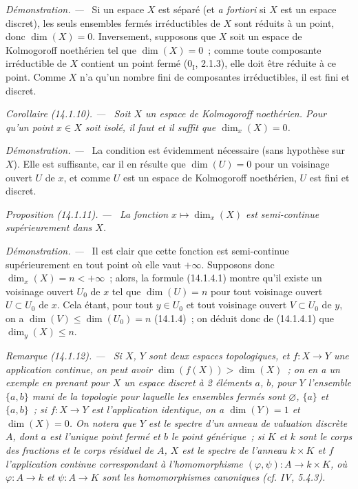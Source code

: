 \documentclass[10pt,oneside]{book}
\makeatletter
\newcommand{\setmanualcurrentlabel}[1]{\def\@currentlabel{#1}}
\newcommand{\oldpage}[2][]{%
  \setcounter{footnote}{0}%
  \marginpar{\scriptsize\textbf{#1}~|~#2}\ignorespaces}
\newenvironment{proposition}[1][]{%
  \setmanualcurrentlabel{#1}\par\medskip\noindent\itshape Proposition (#1). ---\ }{\par}
\newenvironment{corollary}[1][]{%
  \setmanualcurrentlabel{#1}\par\medskip\noindent\itshape Corollaire (#1). ---\ }{\par}
\newenvironment{remark}[1][]{%
  \setmanualcurrentlabel{#1}\par\medskip\noindent\itshape Remarque (#1). ---\ }{\par}
\newenvironment{proof}{%
  \par\medskip\noindent\textit{Démonstration. ---\ }}{\par}
\makeatother
\begin{document}
\begin{proof}
Si un espace $X$ est séparé (et \emph{a fortiori} si $X$ est un espace
discret), les seuls ensembles fermés irréductibles de $X$ sont réduits à un
point, donc $\dim(X)=0$. Inversement, supposons que $X$ soit un espace de
Kolmogoroff noethérien tel que $\dim(X)=0$~; comme toute composante
irréductible de $X$ contient un point fermé ($0_{\mathrm I}$, 2.1.3), elle
doit être réduite à ce point. Comme $X$ n'a qu'un nombre fini de composantes
irréductibles, il est fini et discret.
\end{proof}

\begin{corollary}[14.1.10]
\label{0.14.1.10-fr}
Soit $X$ un espace de Kolmogoroff noethérien. Pour qu'un point $x\in X$ soit
isolé, il faut et il suffit que $\dim_x(X)=0$.
\end{corollary}

\begin{proof}
La condition est évidemment nécessaire (sans hypothèse sur $X$). Elle est
suffisante,
\oldpage[0\textsubscript{IV-1}]{8}
car il en résulte que $\dim(U)=0$ pour un voisinage ouvert $U$ de $x$, et
comme $U$ est un espace de Kolmogoroff noethérien, $U$ est fini et discret.
\end{proof}

\begin{proposition}[14.1.11]
\label{0.14.1.11-fr}
La fonction $x\mapsto\dim_x(X)$ est semi-continue supérieurement dans $X$.
\end{proposition}

\begin{proof}
Il est clair que cette fonction est semi-continue supérieurement en tout
point où elle vaut $+\infty$. Supposons donc $\dim_x(X)=n<+\infty$~; alors,
la formule (14.1.4.1) montre qu'il existe un voisinage ouvert $U_0$ de $x$ tel
que $\dim(U)=n$ pour tout voisinage ouvert $U\subset U_0$ de $x$. Cela étant,
pour tout $y\in U_0$ et tout voisinage ouvert $V\subset U_0$ de $y$, on a
$\dim(V)\leq\dim(U_0)=n$ (14.1.4)~; on déduit donc de (14.1.4.1) que
$\dim_y(X)\leq n$.
\end{proof}

\begin{remark}[14.1.12]
\label{0.14.1.12-fr}
Si $X$, $Y$ sont deux espaces topologiques, et $f:X\to Y$ une application
continue, on peut avoir $\dim(f(X))>\dim(X)$~; on en a un exemple en prenant
pour $X$ un espace discret à 2 éléments $a$, $b$, pour $Y$ l'ensemble
$\{a,b\}$ muni de la topologie pour laquelle les ensembles fermés sont
$\varnothing$, $\{a\}$ et $\{a,b\}$~; si $f:X\to Y$ est l'application
identique, on a $\dim(Y)=1$ et $\dim(X)=0$. On notera que $Y$ est le spectre
d'un anneau de valuation discrète $A$, dont $a$ est l'unique point fermé et
$b$ le point générique~; si $K$ et $k$ sont le corps des fractions et le
corps résiduel de $A$, $X$ est le spectre de l'anneau $k\times K$ et $f$
l'application continue correspondant à l'homomorphisme
$(\varphi,\psi):A\to k\times K$, où $\varphi:A\to k$ et $\psi:A\to K$ sont
les homomorphismes canoniques (cf. IV, 5.4.3).
\end{remark}
\end{document}
